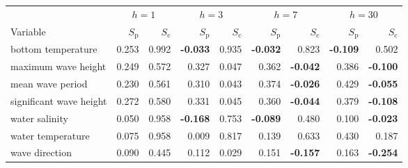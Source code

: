 \begin{tabular}{l rr rr rr rr}
\toprule
 & \multicolumn{2}{c}{$h=1$} & \multicolumn{2}{c}{$h=3$} & \multicolumn{2}{c}{$h=7$} & \multicolumn{2}{c}{$h=30$} \\
\cmidrule(lr){2-3}\cmidrule(lr){4-5}\cmidrule(lr){6-7}\cmidrule(lr){8-9}
Variable & $S_{\mathrm{p}}$ & $S_{\mathrm{c}}$ & $S_{\mathrm{p}}$ & $S_{\mathrm{c}}$ & $S_{\mathrm{p}}$ & $S_{\mathrm{c}}$ & $S_{\mathrm{p}}$ & $S_{\mathrm{c}}$ \\
\midrule
bottom temperature & 0.253 & 0.992 & \textbf{-0.033} & 0.935 & \textbf{-0.032} & 0.823 & \textbf{-0.109} & 0.502 \\
maximum wave height & 0.249 & 0.572 & 0.327 & 0.047 & 0.362 & \textbf{-0.042} & 0.386 & \textbf{-0.100} \\
mean wave period & 0.230 & 0.561 & 0.310 & 0.043 & 0.374 & \textbf{-0.026} & 0.429 & \textbf{-0.055} \\
significant wave height & 0.272 & 0.580 & 0.331 & 0.045 & 0.360 & \textbf{-0.044} & 0.379 & \textbf{-0.108} \\
water salinity & 0.050 & 0.958 & \textbf{-0.168} & 0.753 & \textbf{-0.089} & 0.480 & 0.100 & \textbf{-0.023} \\
water temperature & 0.075 & 0.958 & 0.009 & 0.817 & 0.139 & 0.633 & 0.430 & 0.187 \\
wave direction & 0.090 & 0.445 & 0.112 & 0.029 & 0.151 & \textbf{-0.157} & 0.163 & \textbf{-0.254} \\
\bottomrule
\end{tabular}